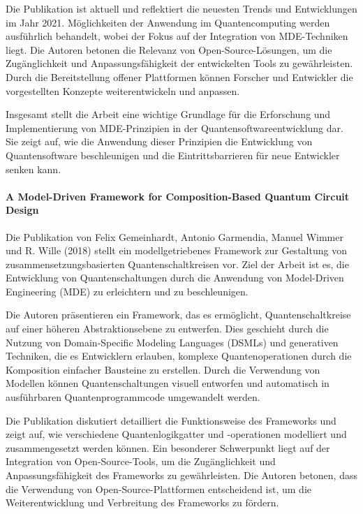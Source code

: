 Die Publikation ist aktuell und reflektiert die neuesten Trends und Entwicklungen im Jahr 2021. Möglichkeiten der Anwendung 
im Quantencomputing werden ausführlich behandelt, wobei der Fokus auf der Integration von MDE-Techniken liegt. 
Die Autoren betonen die Relevanz von Open-Source-Lösungen, um die Zugänglichkeit und Anpassungsfähigkeit der 
entwickelten Tools zu gewährleisten. Durch die Bereitstellung offener Plattformen können Forscher und Entwickler 
die vorgestellten Konzepte weiterentwickeln und anpassen.

Insgesamt stellt die Arbeit eine wichtige Grundlage für die Erforschung und Implementierung von MDE-Prinzipien 
in der Quantensoftwareentwicklung dar. Sie zeigt auf, wie die Anwendung dieser Prinzipien die Entwicklung von 
Quantensoftware beschleunigen und die Eintrittsbarrieren für neue Entwickler senken kann.

\paragraph{A Model-Driven Framework for Composition-Based Quantum Circuit Design}

Die Publikation von Felix Gemeinhardt, Antonio Garmendia, Manuel Wimmer und R. Wille (2018) 
stellt ein modellgetriebenes Framework zur Gestaltung von zusammensetzungsbasierten Quantenschaltkreisen vor. Ziel der Arbeit 
ist es, die Entwicklung von Quantenschaltungen durch die Anwendung von Model-Driven Engineering (MDE) zu erleichtern und zu beschleunigen.

Die Autoren präsentieren ein Framework, das es ermöglicht, Quantenschaltkreise auf einer höheren Abstraktionsebene zu entwerfen. 
Dies geschieht durch die Nutzung von Domain-Specific Modeling Languages (DSMLs) und generativen Techniken, die 
es Entwicklern erlauben, komplexe Quantenoperationen durch die Komposition einfacher Bausteine zu erstellen. 
Durch die Verwendung von Modellen können Quantenschaltungen visuell entworfen und automatisch in ausführbaren Quantenprogrammcode umgewandelt werden.

Die Publikation diskutiert detailliert die Funktionsweise des Frameworks und zeigt auf, wie verschiedene 
Quantenlogikgatter und -operationen modelliert und zusammengesetzt werden können. Ein besonderer Schwerpunkt liegt auf 
der Integration von Open-Source-Tools, um die Zugänglichkeit und Anpassungsfähigkeit des Frameworks zu gewährleisten. 
Die Autoren betonen, dass die Verwendung von Open-Source-Plattformen entscheidend ist, um die Weiterentwicklung und Verbreitung des Frameworks zu fördern.

